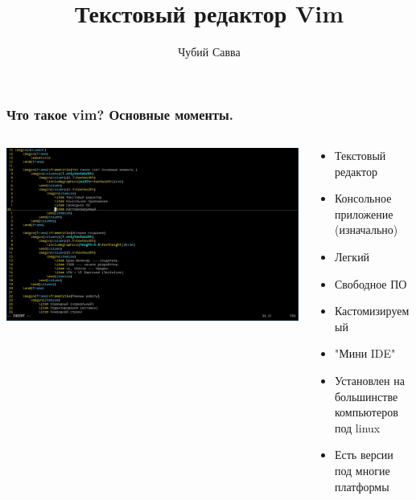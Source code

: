 \documentclass[aspectratio=169]{beamer}
\title{Текстовый редактор Vim}
\author{Чубий Савва}
\institute{Лицей НИУ ВШЭ}
\date{}%
\begin{document}
    \begin{frame}
        \maketitle
    \end{frame}

    \begin{frame}\frametitle{Что такое vim? Основные моменты.}
        \begin{columns}[T,onlytextwidth]
            \begin{column}{0.6\textwidth}
                \includegraphics[width=\textwidth]{vim}
            \end{column}
            \begin{column}{0.4\textwidth}
                \begin{itemize}
                    \item Текстовый редактор
                    \item Консольное приложение (изначально)
                    \item Легкий
                    \item Свободное ПО
                    \item Кастомизируемый
                    \item "Мини IDE"
                    \item Установлен на большинстве компьютеров под linux
                    \item Есть версии под многие платформы
                \end{itemize}
            \end{column}
        \end{columns}
    \end{frame}
\end{document}
